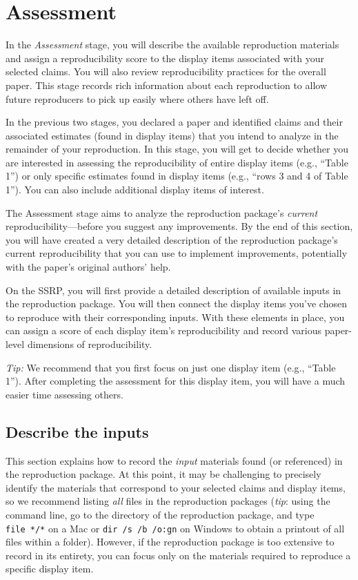 \documentclass[
]{book}
\begin{document}
\hypertarget{assessment}{%
\chapter{Assessment}\label{assessment}}

In the \emph{Assessment} stage, you will describe the available reproduction materials and assign a reproducibility score to the display items associated with your selected claims. You will also review reproducibility practices for the overall paper. This stage records rich information about each reproduction to allow future reproducers to pick up easily where others have left off.

In the previous two stages, you declared a paper and identified claims and their associated estimates (found in display items) that you intend to analyze in the remainder of your reproduction. In this stage, you will get to decide whether you are interested in assessing the reproducibility of entire display items (e.g., ``Table 1'') or only specific estimates found in display items (e.g., ``rows 3 and 4 of Table 1''). You can also include additional display items of interest.

The Assessment stage aims to analyze the reproduction package's \emph{current} reproducibility---before you suggest any improvements. By the end of this section, you will have created a very detailed description of the reproduction package's current reproducibility that you can use to implement improvements, potentially with the paper's original authors' help.

On the SSRP, you will first provide a detailed description of available inputs in the reproduction package. You will then connect the display items you've chosen to reproduce with their corresponding inputs. With these elements in place, you can assign a score of each display item's reproducibility and record various paper-level dimensions of reproducibility.

\emph{Tip:} We recommend that you first focus on just one display item (e.g., ``Table 1''). After completing the assessment for this display item, you will have a much easier time assessing others.

\hypertarget{describe-inputs}{%
\section{Describe the inputs}\label{describe-inputs}}

This section explains how to record the \emph{input} materials found (or referenced) in the reproduction package. At this point, it may be challenging to precisely identify the materials that correspond to your selected claims and display items, so we recommend listing \emph{all} files in the reproduction packages (\emph{tip}: using the command line, go to the directory of the reproduction package, and type \texttt{file\ */*} on a Mac or \texttt{dir\ /s\ /b\ /o:gn} on Windows to obtain a printout of all files within a folder). However, if the reproduction package is too extensive to record in its entirety, you can focus only on the materials required to reproduce a specific display item.
\end{document}
